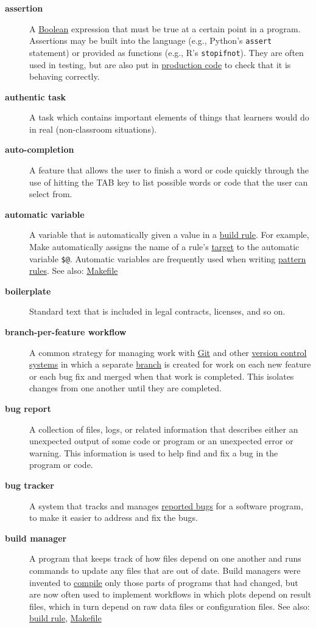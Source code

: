 \documentclass[
]{krantz}
\begin{document}
\begin{description}
\item[\textbf{assertion}]
A \protect\hyperlink{boolean}{Boolean} expression that must be true at a certain point in a program. Assertions may be built into the language (e.g., Python's \texttt{assert} statement) or provided as functions (e.g., R's \texttt{stopifnot}). They are often used in testing, but are also put in \protect\hyperlink{production_code}{production code} to check that it is behaving correctly.
\item[\textbf{authentic task}]
A task which contains important elements of things that learners would do in real (non-classroom situations).
\item[\textbf{auto-completion}]
A feature that allows the user to finish a word or code quickly through the use of hitting the TAB key to list possible words or code that the user can select from.
\item[\textbf{automatic variable}]
A variable that is automatically given a value in a \protect\hyperlink{build_rule}{build rule}. For example, Make automatically assigns the name of a rule's \protect\hyperlink{build_target}{target} to the automatic variable \texttt{\$@}. Automatic variables are frequently used when writing \protect\hyperlink{pattern_rule}{pattern rules}. See also: \protect\hyperlink{makefile}{Makefile}
\item[\textbf{boilerplate}]
Standard text that is included in legal contracts, licenses, and so on.
\item[\textbf{branch-per-feature workflow}]
A common strategy for managing work with \protect\hyperlink{git}{Git} and other \protect\hyperlink{version_control_system}{version control systems} in which a separate \protect\hyperlink{git_branch}{branch} is created for work on each new feature or each bug fix and merged when that work is completed. This isolates changes from one another until they are completed.
\item[\textbf{bug report}]
A collection of files, logs, or related information that describes either an unexpected output of some code or program or an unexpected error or warning. This information is used to help find and fix a bug in the program or code.
\item[\textbf{bug tracker}]
A system that tracks and manages \protect\hyperlink{bug_report}{reported bugs} for a software program, to make it easier to address and fix the bugs.
\item[\textbf{build manager}]
A program that keeps track of how files depend on one another and runs commands to update any files that are out of date. Build managers were invented to \protect\hyperlink{compile}{compile} only those parts of programs that had changed, but are now often used to implement workflows in which plots depend on result files, which in turn depend on raw data files or configuration files. See also: \protect\hyperlink{build_rule}{build rule}, \protect\hyperlink{makefile}{Makefile}

\end{description}
\end{document}
